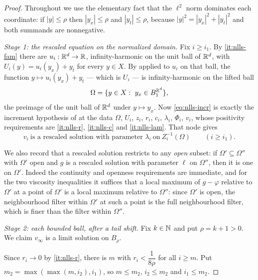 \begin{proof}
Throughout we use the elementary fact that the $\ell^2$ norm dominates each
coordinate: if $|y|\le\rho$ then $|y_x|\le\rho$ and $|y_t|\le\rho$, because
$|y|^2=|y_x|^2+|y_t|^2$ and both summands are nonnegative.

\emph{Stage 1: the rescaled equation on the normalized domain.} Fix $i\ge i_1$.
By \ref{it:nlls-fam} there are $u_i:\mathbb{R}^d\to\mathbb{R}$, infinity-harmonic on the unit
ball of $\mathbb{R}^d$, with $U_i(y)=u_i(y_x)+y_t$ for every $y\in X$. By
 applied to $u_i$ on that ball, the function
$y\mapsto u_i(y_x)+y_t$ --- which is $U_i$ --- is infinity-harmonic on the
lifted ball
\[
  \Omega=\{y\in X:\ y_x\in B_1^{\mathbb{R}^d}\},
\]
the preimage of the unit ball of $\mathbb{R}^d$ under $y\mapsto y_x$. Now
\eqref{eq:nlls-incr} is exactly the increment hypothesis of
 at the data $\Omega$, $U_i$, $z_i$, $r_i$, $c_i$,
$\lambda_i$, $\Phi_i$, $v_i$, whose positivity requirements are
\ref{it:nlls-r}, \ref{it:nlls-c} and \ref{it:nlls-lam}. That node gives
\begin{equation}\label{eq:nlls-resc}
  v_i\ \text{is a rescaled solution with parameter }\lambda_i
  \ \text{on}\ Z_i^{-1}(\Omega)\qquad(i\ge i_1).
\end{equation}

We also record that a rescaled solution restricts to any \emph{open} subset: if
$\Omega'\subseteq\Omega''$ with $\Omega'$ open and $g$ is a rescaled solution
with parameter $\ell$ on $\Omega''$, then it is one on $\Omega'$. Indeed the
continuity and openness requirements are immediate, and for the two viscosity
inequalities it suffices that a local maximum of $g-\varphi$ relative to
$\Omega'$ at a point of $\Omega'$ is a local maximum relative to $\Omega''$:
since $\Omega'$ is open, the neighbourhood filter within $\Omega'$ at such a
point is the full neighbourhood filter, which is finer than the filter within
$\Omega''$.

\emph{Stage 2: each bounded ball, after a tail shift.} Fix $k\in\mathbb{N}$ and put
$\rho=k+1>0$. We claim $v_\infty$ is a limit solution on $B_\rho$.

Since $r_i\to0$ by \ref{it:nlls-r}, there is $m$ with
$r_i<\dfrac1{8\rho}$ for all $i\ge m$. Put $m_2=\max(\max(m,i_2),i_1)$, so
$m\le m_2$, $i_2\le m_2$ and $i_1\le m_2$.


\end{proof}
